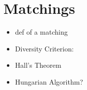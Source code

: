 \section{Matchings}\label{sec:matchings}

\begin{itemize}
    \item def of a matching
    \item Diversity Criterion:
    \item Hall's Theorem
    \item Hungarian Algorithm?
\end{itemize}
